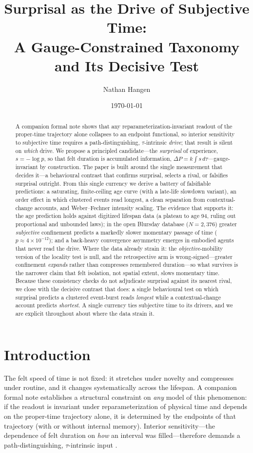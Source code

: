 \documentclass[11pt]{article}
\title{Surprisal as the Drive of Subjective Time:\\
A Gauge-Constrained Taxonomy and Its Decisive Test}
\author{Nathan Hangen}
\date{\today}
\begin{document}
\maketitle

\begin{abstract}
A companion formal note shows that any reparameterization-invariant readout of the
proper-time trajectory alone collapses to an endpoint functional, so interior
sensitivity to subjective time requires a path-distinguishing, $\tau$-intrinsic
\emph{drive}; that result is silent on \emph{which} drive. We propose a principled
candidate---the \emph{surprisal} of experience, $s=-\log p$, so that felt duration is
accumulated information, $\Delta P = k\int s\,d\tau$---gauge-invariant by construction.
The paper is built around the single measurement that decides it---a behavioural
contrast that confirms surprisal, selects a rival, or falsifies surprisal outright.
From this single currency we derive a battery of falsifiable predictions: a saturating,
finite-ceiling age curve (with a late-life slowdown variant), an order effect in which
clustered events read longest, a clean separation from contextual-change accounts, and
Weber--Fechner intensity scaling. The evidence that supports it: the age prediction holds
against digitized lifespan data (a plateau to age 94, ruling out proportional and
unbounded laws); in the open Blursday database ($N=2{,}376$) greater \emph{subjective}
confinement predicts a markedly slower momentary passage of time
($p\approx4\times10^{-12}$); and a back-heavy convergence asymmetry emerges in embodied
agents that never read the drive. Where the data already strain it: the
\emph{objective}-mobility version of the locality test is null, and the retrospective arm
is wrong-signed---greater confinement \emph{expands} rather than compresses remembered
duration---so what survives is the narrower claim that felt isolation, not spatial extent,
slows momentary time. Because these consistency checks do not adjudicate surprisal against
its nearest rival, we close with the decisive contrast that does: a single behavioural test
on which surprisal predicts a clustered event-burst reads \emph{longest} while a
contextual-change account predicts \emph{shortest}. A single currency ties subjective time
to its drivers, and we are explicit throughout about where the data strain it.
\end{abstract}

\section{Introduction}
The felt speed of time is not fixed: it stretches under novelty and compresses under
routine, and it changes systematically across the lifespan. A companion formal note
establishes a structural constraint on \emph{any} model of this phenomenon: if the
readout is invariant under reparameterization of physical time and depends on the
proper-time trajectory alone, it is determined by the endpoints of that trajectory
(with or without internal memory). Interior sensitivity---the dependence of felt
duration on \emph{how} an interval was filled---therefore demands a
path-distinguishing, $\tau$-intrinsic input \citep{timeperception2026theorem}.
\end{document}
